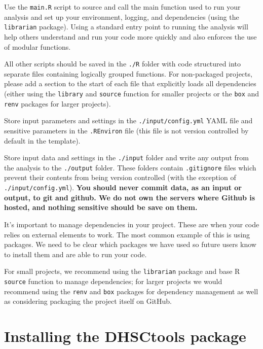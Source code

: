 \documentclass[
  letterpaper,
]{book}
\begin{document}
Use the \texttt{main.R} script to source and call the main function used
to run your analysis and set up your environment, logging, and
dependencies (using the \texttt{librarian} package). Using a standard
entry point to running the analysis will help others understand and run
your code more quickly and also enforces the use of modular functions.

All other scripts should be saved in the \texttt{./R} folder with code
structured into separate files containing logically grouped functions.
For non-packaged projects, please add a section to the start of each
file that explicitly loads all dependencies (either using the
\texttt{library} and \texttt{source} function for smaller projects or
the \texttt{box} and \texttt{renv} packages for larger projects).

Store input parameters and settings in the \texttt{./input/config.yml}
YAML file and sensitive parameters in the \texttt{.REnviron} file (this
file is not version controlled by default in the template).

Store input data and settings in the \texttt{./input} folder and write
any output from the analysis to the \texttt{./output} folder. These
folders contain \texttt{.gitignore} files which prevent their contents
from being version controlled (with the exception of
\texttt{./input/config.yml}). \textbf{You should never commit data, as
an input or output, to git and github. We do not own the servers where
Github is hosted, and nothing sensitive should be save on them.}

It's important to manage dependencies in your project. These are when
your code relies on external elements to work. The most common example
of this is using packages. We need to be clear which packages we have
used so future users know to install them and are able to run your code.

For small projects, we recommend using the \texttt{librarian} package
and base R \texttt{source} function to manage dependencies; for larger
projects we would recommend using the \texttt{renv} and \texttt{box}
packages for dependency management as well as considering packaging the
project itself on GitHub.

\hypertarget{installing-the-dhsctools-package}{%
\section{Installing the DHSCtools
package}\label{installing-the-dhsctools-package}}
\end{document}
